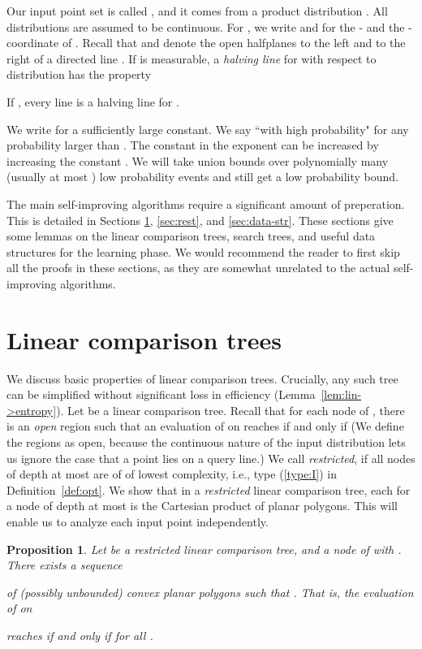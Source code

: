 \documentclass[letterpaper,11pt]{article}
\newtheorem{prop}[theorem]{Proposition}
\begin{document}
 Our input point set 
is called 
, 
and it comes from a product
distribution 
. 
All distributions 
are assumed to be continuous.
For , we 
write  and  for the 
- and the -coordinate 
of .  Recall that 
 and  denote
the open halfplanes to
the left and to the right of
a directed line .
If  is measurable, 
a \emph{halving line} 
for  with respect to distribution
 has the property 

If , every 
line is a halving line for . 

We write  for a sufficiently 
large constant.
We say ``with high probability" for 
any probability larger than 
.
The constant in the exponent 
can be increased by increasing
the constant . We will take union 
bounds over polynomially many 
(usually at most ) 
low probability events and still get a 
low probability bound.

The main self-improving algorithms require a significant amount of preperation. This is detailed in Sections \ref{sec:comp}, \ref{sec:rest}, and \ref{sec:data-str}. These sections give some lemmas
on the linear comparison trees, search trees, and useful data structures for the learning phase.
We would recommend the reader to first
skip all the proofs in these sections, as they are somewhat unrelated to the actual self-improving algorithms.

\section{Linear comparison trees} \label{sec:comp}

We discuss  basic properties 
of linear comparison trees.
Crucially,  
any such tree can be
simplified without significant loss in
efficiency (Lemma~\ref{lem:lin->entropy}).
Let  be a linear comparison tree.
Recall that for each node  of , 
there is an \emph{open} region 
 such that 
an evaluation of  on  reaches  
if and only if 
(We define the regions as open,
because the continuous nature of
the input distribution lets us 
ignore the case that a point
lies on a query line.)
We call 
\emph{restricted}, if all nodes 
of depth at most  are of
of lowest complexity, 
i.e., type (\ref{type:I})
in Definition~\ref{def:opt}.
We show 
that in a \emph{restricted} linear 
comparison tree, each  for
a node of depth at most  is 
the Cartesian product of planar polygons. 
This will enable us to analyze each input point
independently.

\begin{prop}\label{prop:Cartesian}
  Let  be a restricted linear 
  comparison tree, and  a node of
   with . There exists a sequence 
  
  of (possibly unbounded) convex planar 
  polygons such that 
  . 
  That is, the evaluation of  on 
   
  reaches  if and only 
  if  for all .
\end{prop}
\end{document}
